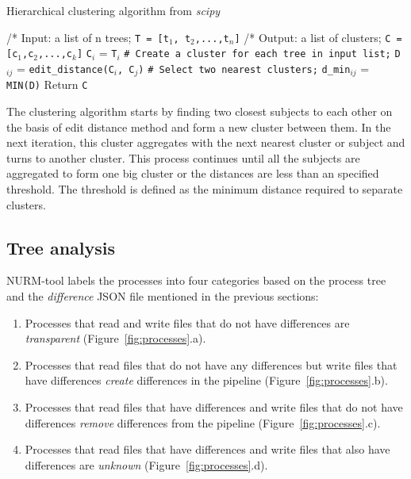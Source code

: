 \documentclass[a4paper,num-refs]{oup-contemporary}
\begin{document}
\begin{algorithm}[h!]
\caption{Hierarchical clustering algorithm from \textit{scipy}}
\label{algo:hclustering}
\begin{algorithmic}

  \State /* Input: a list of n trees; \texttt{T = [t${_1}$, t${_2}$,...,t${_n}$]}
  \State /* Output: a list of clusters; \texttt{C = [c${_1}$,c${_2}$,...,c${_k}$]}
  \State \texttt{C${_i}$} = \texttt{T${_i}$} 
  \State \texttt{\# Create a cluster for each tree in input list;}
  \EndFor
  \State \texttt{D${_{ij}}$} = \texttt{edit\_distance(C${_i}$, C${_j}$)}
  \State \texttt{\# Select two nearest clusters;}
  \EndFor
  \EndFor
  \State \texttt{d\_min${_{ij}}$} = \texttt{MIN(D)}
  \State Return \texttt{C}
  \EndIf
  \EndWhile
\end{algorithmic}
\end{algorithm}

The clustering algorithm starts by finding two closest subjects to each 
other on the basis of edit distance method and form a new cluster 
between them. In the next iteration, this cluster aggregates with the 
next nearest cluster or subject and turns to another cluster. This 
process continues until all the subjects are aggregated to form one big 
cluster or the distances are less than an specified threshold. The 
threshold is defined as the minimum distance required to separate 
clusters. 


\subsection{Tree analysis}

NURM-tool labels the processes into four 
categories based on the process tree and the \textit{difference} JSON file 
mentioned in the previous sections:
\begin{enumerate}
\item Processes that read and write files that do not have differences 
are \emph{transparent} (Figure~\ref{fig:processes}.a).
\item Processes that read files 
that do not have any differences but write files that have differences 
\emph{create} differences in the pipeline (Figure~\ref{fig:processes}.b).
\item Processes that read files 
that have differences and write files that do not have differences \emph{remove} 
differences from the pipeline (Figure~\ref{fig:processes}.c).
\item Processes that read files that have differences and write files that 
also have differences are 
\emph{unknown} (Figure~\ref{fig:processes}.d).
\end{enumerate}
\end{document}
